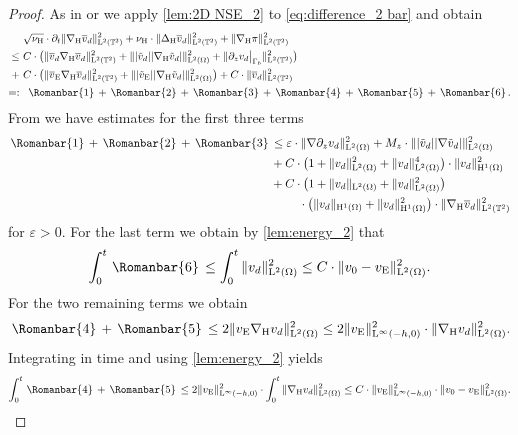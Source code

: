 \documentclass[preprint]{elsarticle}
\numberwithin{equation}{section}
\newcommand {\T}	{\mathbb{T}}
\renewcommand{\H}{\mathrm{H}}
\renewcommand{\bar}[1]{\overline{#1}}
\newcommand{\vbar}{\bar{v}}
\newcommand{\vtilde}{\tilde{v}}
\newcommand{\nablaH}{\nabla_{\H}}
\newcommand{\DeltaH}{\Delta_{\H}}
\newcommand{\rL}{\mathrm{L}}
\newcommand{\rH}{\H}
\newcommand{\rE}{\mathrm{E}}
\newcommand{\I}{\, \Romanbar{1} \, }
\newcommand{\II}{\, \Romanbar{2}\, }
\newcommand{\III}{\, \Romanbar{3}\, }
\newcommand{\IV}{\, \Romanbar{4}\, }
\newcommand{\V}{\, \Romanbar{5}\, }
\newcommand{\VI}{\, \Romanbar{6}\, }
\begin{document}
\begin{proof}
	As in \cite[Step 1]{HK:16_2} or \cite[Step 2]{GGHHK:20_2} we 
	apply \autoref{lem:2D NSE_2} to \eqref{eq:difference_2 bar} and obtain
	\begin{equation*}
		\begin{aligned}
			&\sqrt{\nu_{\rH}}\cdot \partial_t \| \nablaH \vbar_d \|_{\rL^2(\T^2)}^2
			+ \nu_{\rH} \cdot \| \DeltaH \vbar_d \|_{\rL^2(\T^2)}^2
			+ \| \nablaH \pi \|_{\rL^2(\T^2)}^2
			\\
			\leq \ &C \cdot \bigl(\| \vbar_d \nablaH \vbar_d \|_{\rL^2(\T^2)}^2
			+ \| |\vtilde_d| |\nablaH \vtilde_d| \|_{\rL^2(\Omega)}^2
			+ \| \partial_z v_d\big|_{\Gamma_b} \|_{\rL^2(\T^2)}^2\bigr) \\
			+ \ &C \cdot
			\bigl( 
			\| \vbar_{\rE} \nablaH \vbar_d \|_{\rL^2(\T^2)}^2
			+ \| |\vtilde_{\rE}| |\nablaH \vtilde_d| \|_{\rL^2(\Omega)}^2
			\bigr) 
			+ C \cdot \| \vbar_d \|_{\rL^2(\T^2)}^2\\
			=: \ & \ \I + \II + \III + \IV + \V + \VI .
		\end{aligned}
	\end{equation*}
	From \cite[Step 1, (6.5)]{HK:16_2} we have estimates for the first three terms
	\begin{align*}
		\I + \II + \III 
		&\leq
		\varepsilon \cdot \| \nabla \partial_z v_d \|_{\rL^2(\Omega)}^2
		+ M_z \cdot \| |\vtilde_d| |\nabla \vtilde_d| \|_{\rL^2(\Omega)}^2\\
		&+ C \cdot \bigl( 1+ \| v_d \|_{\rL^2(\Omega)}^2 + \| v_d \|_{\rL^2(\Omega)}^4 \bigr) \cdot \| v_d \|_{\rH^1(\Omega)}^2 \\
		&+ C \cdot \bigl( 1+ \| v_d \|_{\rL^2(\Omega)} + \| v_d \|_{\rL^2(\Omega)}^2 \bigr) 
		\\ &\hspace{24pt} \cdot \bigl( \| v_d \|_{\rH^1(\Omega)}+\| v_d \|_{\rH^1(\Omega)}^2 \bigr) \cdot \| \nablaH \vbar_d \|_{\rL^2(\T^2)}^2
	\end{align*}
	for $\varepsilon > 0$. 
	For the last term we obtain by \autoref{lem:energy_2} that
	\begin{equation*}
		\int_0^t \VI
		\leq \int_0^t \| v_d \|_{\rL^2(\Omega)}^2
		\leq C \cdot \| v_0 - v_{\rE} \|_{\rL^2(\Omega)}^2 .
	\end{equation*}
	For the two remaining terms we obtain
	\begin{equation*}
		\IV + \V 
		\leq 2 
		\| v_{\rE} \nablaH v_d \|_{\rL^2(\Omega)}^2
		\leq 2 
		\| v_{\rE} \|_{\rL^\infty(-h,0)}^2
		\cdot \| \nablaH v_d \|_{\rL^2(\Omega)}^2 .
	\end{equation*}
	Integrating in time and using \autoref{lem:energy_2} yields
	\begin{equation*}
		\int_0^t \IV + \V 
		\leq 2 
		\| v_{\rE} \|_{\rL^\infty(-h,0)}^2
		\cdot \int_0^t \| \nablaH v_d \|_{\rL^2(\Omega)}^2 
		\leq C 
		\cdot
		\| v_{\rE} \|_{\rL^\infty(-h,0)}^2 
		\cdot 
		\| v_0 - v_{\rE} \|_{\rL^2(\Omega)}^2 .
		\qedhere
	\end{equation*}
\end{proof}
\end{document}
